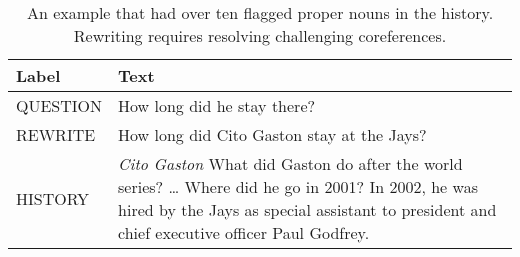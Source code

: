 %
%
%

 
\begin{table}
	\small
	\centering
	\begin{tabular*}{\linewidth}{l p{10cm}}

		{\bf Label} & {\bf Text} \\
          \hline
        
         QUESTION & How long did he stay there? \\
         \rowcolor{gray!25}
		REWRITE  & How long did Cito Gaston stay at the Jays? \\
		
		HISTORY & \parbox{10 cm}{\textit{Cito Gaston}
                            What did Gaston do after the world series? \dots {} Where did he go in 2001? 
                            In 2002, he was hired by the Jays as special assistant to president and chief executive officer Paul Godfrey.} \\
	\end{tabular*}
	\caption{An example that had over ten flagged proper nouns in the history. Rewriting requires resolving challenging coreferences.}
	  
	\label{tab:coreferenceexample}
\end{table}



